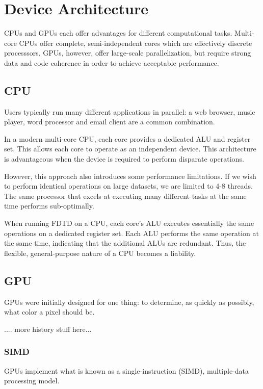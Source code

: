 \chapter{Device Architecture} \label{ch:device architecture}

CPUs and GPUs each offer advantages for different computational tasks. Multi-core CPUs offer complete, semi-independent cores which are effectively discrete processsors. GPUs, however, offer large-scale parallelization, but require strong data and code coherence in order to achieve acceptable performance.


\section{CPU}

Users typically run many different applications in parallel: a web browser, music player, word processor and email client are a common combination.

In a modern multi-core CPU, each core provides a dedicated ALU and register set. This allows each core to operate as an independent device. This architecture is advantageous when the device is required to perform disparate operations.

However, this approach also introduces some performance limitations. If we wish to perform identical operations on large datasets, we are limited to 4-8 threads. The same processor that excels at executing many different tasks at the same time performs sub-optimally. 

When running FDTD on a CPU, each core's ALU executes essentially the same operations on a dedicated register set. Each ALU performs the same operation at the same time, indicating that the additional ALUs are redundant. Thus, the flexible, general-purpose nature of a CPU becomes a liability.

\section{GPU}

GPUs were initially designed for one thing: to determine, as quickly as possibly, what color a pixel should be. 

.... more history stuff here...


\subsection{SIMD}

GPUs implement what is known as a single-instruction (SIMD), multiple-data processing model.


